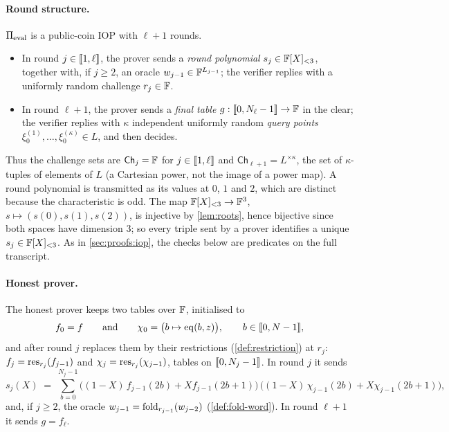 \paragraph{Round structure.}
$\Pi_{\mathrm{eval}}$ is a public-coin IOP with $\ell+1$ rounds.
\begin{itemize}
  \item In round $j \in \llbracket 1, \ell \rrbracket$, the prover sends a \emph{round polynomial} $s_j \in \mathbb{F}[X]_{<3}$, together with, if $j \ge 2$, an oracle $w_{j-1} \in \mathbb{F}^{L_{j-1}}$; the verifier replies with a uniformly random challenge $r_j \in \mathbb{F}$.
  \item In round $\ell+1$, the prover sends a \emph{final table} $g : \llbracket 0, N_\ell-1 \rrbracket \to \mathbb{F}$ in the clear; the verifier replies with $\kappa$ independent uniformly random \emph{query points} $\xi^{(1)}_0,\dots,\xi^{(\kappa)}_0 \in L$, and then decides.
\end{itemize}
Thus the challenge sets are $\mathsf{Ch}_j = \mathbb{F}$ for $j \in \llbracket 1, \ell \rrbracket$ and $\mathsf{Ch}_{\ell+1} = L^{\times\kappa}$, the set of $\kappa$-tuples of elements of $L$ (a Cartesian power, not the image of a power map).
A round polynomial is transmitted as its values at $0$, $1$ and $2$, which are distinct because the characteristic is odd. The map $\mathbb{F}[X]_{<3} \to \mathbb{F}^3$, $s \mapsto (s(0), s(1), s(2))$, is injective by \cref{lem:roots}, hence bijective since both spaces have dimension $3$; so every triple sent by a prover identifies a unique $s_j \in \mathbb{F}[X]_{<3}$.
As in \cref{sec:proofs:iop}, the checks below are predicates on the full transcript.

\paragraph{Honest prover.}
The honest prover keeps two tables over $\mathbb{F}$, initialised to
\[
  f_0 = f \qquad\text{and}\qquad \chi_0 = \bigl(b \mapsto \mathrm{eq}(b,z)\bigr), \qquad b \in \llbracket 0, N-1 \rrbracket,
\]
and after round $j$ replaces them by their restrictions (\cref{def:restriction}) at $r_j$: $f_j = \mathrm{res}_{r_j}(f_{j-1})$ and $\chi_j = \mathrm{res}_{r_j}(\chi_{j-1})$, tables on $\llbracket 0, N_j-1 \rrbracket$.
In round $j$ it sends
\begin{equation}\label{eq:honest-sj}
  s_j(X) \;=\; \sum_{b=0}^{N_j - 1}
      \bigl((1-X)\, f_{j-1}(2b) + X f_{j-1}(2b+1)\bigr)\,
      \bigl((1-X)\, \chi_{j-1}(2b) + X \chi_{j-1}(2b+1)\bigr),
\end{equation}
and, if $j \ge 2$, the oracle $w_{j-1} = \mathrm{fold}_{r_{j-1}}(w_{j-2})$ (\cref{def:fold-word}).
In round $\ell+1$ it sends $g = f_\ell$.

